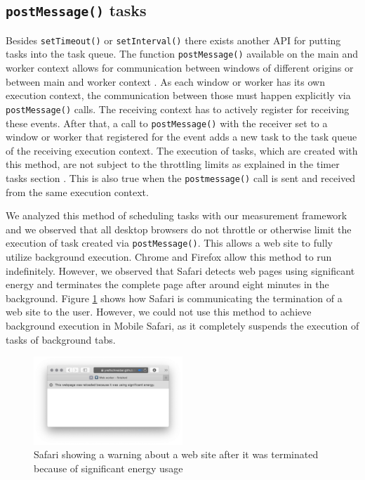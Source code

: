 \documentclass[
	ruledheaders=section,%
	class=report,%
	thesis={type=bachelor},%
	accentcolor=9c,%
	custommargins=true,%
	marginpar=false,%
	parskip=half-,%
	fontsize=11pt,%
]{tudapub}
\begin{document}
  \subsection{\texttt{postMessage()} tasks}

  Besides \texttt{setTimeout()} or \texttt{setInterval()} there exists another API for putting tasks into the task queue. The function \texttt{postMessage()} available on the main and worker context allows for communication between windows of different origins or between main and worker context \cite{mdn-postmessage}. As each window or worker has its own execution context, the communication between those must happen explicitly via \texttt{postMessage()} calls. The receiving context has to actively register for receiving these events. After that, a call to \texttt{postMessage()} with the receiver set to a window or worker that registered for the event adds a new task to the task queue of the receiving execution context. The execution of tasks, which are created with this method, are not subject to the throttling limits as explained in the timer tasks section \cite{zero-delay-timeouts}. This is also true when the \texttt{postmessage()} call is sent and received from the same execution context.

  We analyzed this method of scheduling tasks with our measurement framework and we observed that all desktop browsers do not throttle or otherwise limit the execution of task created via \texttt{postMessage()}. This allows a web site to fully utilize background execution. Chrome and Firefox allow this method to run indefinitely. However, we observed that Safari detects web pages using significant energy and terminates the complete page after around eight minutes in the background. Figure \ref{fig:significant-energy} shows how Safari is communicating the termination of a web site to the user. However, we could not use this method to achieve background execution in Mobile Safari, as it completely suspends the execution of tasks of background tabs.

  \begin{figure}
    \centering
      \includegraphics[width=0.5\textwidth]{images/significant-energy.png}
    \caption{Safari showing a warning about a web site after it was terminated because of significant energy usage}
    \label{fig:significant-energy}
  \end{figure}
\end{document}
